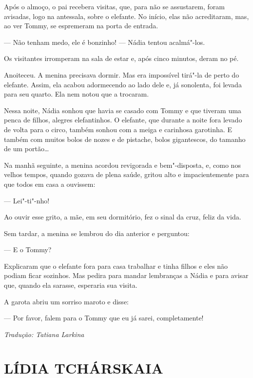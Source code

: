 Após o almoço, o pai recebera visitas, que, para não se assustarem,
foram avisadas, logo na antessala, sobre o elefante. No início, elas não
acreditaram, mas, ao ver Tommy, se espremeram na porta de entrada.

--- Não tenham medo, ele é bonzinho! --- Nádia tentou acalmá"-los.

Os visitantes irromperam na sala de estar e, após cinco minutos, deram
no pé.

Anoiteceu. A menina precisava dormir. Mas era impossível tirá"-la de
perto do elefante. Assim, ela acabou adormecendo ao lado dele e, já
sonolenta, foi levada para seu quarto. Ela nem notou que a trocaram.

Nessa noite, Nádia sonhou que havia se casado com Tommy e que tiveram
uma penca de filhos, alegres elefantinhos. O elefante, que durante a
noite fora levado de volta para o circo, também sonhou com a meiga e
carinhosa garotinha. E também com muitos bolos de nozes e de pistache,
bolos gigantescos, do tamanho de um portão\ldots{}

Na manhã seguinte, a menina acordou revigorada e bem"-disposta, e, como
nos velhos tempos, quando gozava de plena saúde, gritou alto e
impacientemente para que todos em casa a ouvissem:

--- Lei"-ti"-nho!

Ao ouvir esse grito, a mãe, em seu dormitório, fez o sinal da cruz,
feliz da vida.

Sem tardar, a menina se lembrou do dia anterior e perguntou:

--- E o Tommy?

Explicaram que o elefante fora para casa trabalhar e tinha filhos e eles não podiam ficar sozinhos. Mas pedira para mandar lembranças
a Nádia e para avisar que, quando ela sarasse, esperaria sua visita.

A garota abriu um sorriso maroto e disse:

--- Por favor, falem para o Tommy que eu já sarei, completamente!

\medskip

{\footnotesize\hfill\emph{Tradução: Tatiana Larkina}}


\part[LÍDIA TCHÁRSKAIA]{LÍDIA TCHÁRSKAIA }

